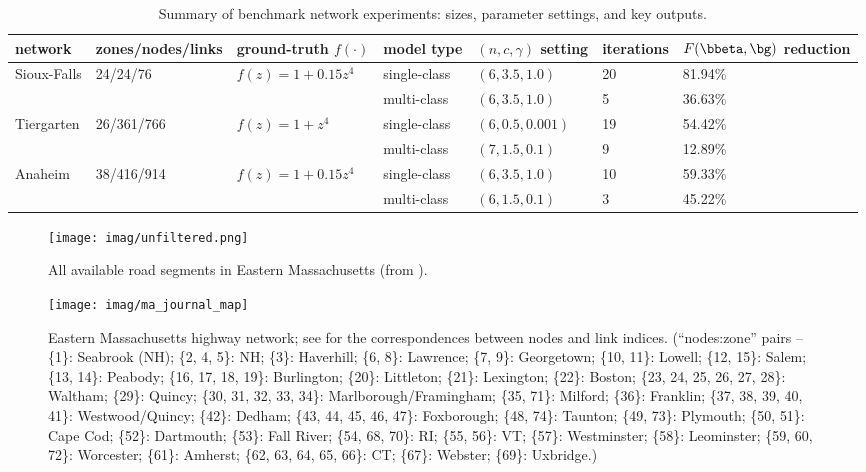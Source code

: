 \documentclass[3p]{elsarticle}
\begin{document}
	
	
\begin{table*}[hbt] 
	\centering
	\caption{Summary of benchmark network experiments: sizes,
          parameter settings, and key outputs.} \label{tab1} 
	\resizebox{\linewidth}{!}
	{\begin{tabular}{lllllll}
			\toprule[1.2pt]
			\textbf{network}  & \textbf{zones/nodes/links} & \textbf{ground-truth $f(\cdot)$} & \textbf{model type} & \textbf{$(n,c,\gamma)$ setting}  & \textbf{iterations} & \textbf{$F(\bbeta,\bg)$ reduction}  \\
			\midrule[1.2pt]
			\multirow{2}{*}{Sioux-Falls} & \multirow{2}{*}{24/24/76} & \multirow{2}{*}{$f(z) = 1 + 0.15z^4$} & single-class & $(6,3.5,1.0)$ &  20  & 81.94\% \\ & & & multi-class  & $(6,3.5,1.0)$ &  5  & 36.63\% \\
			\midrule[1.2pt]
			\multirow{2}{*}{Tiergarten}  & \multirow{2}{*}{26/361/766}  & \multirow{2}{*}{$f(z) = 1 + z^4$} & single-class & $(6,0.5,0.001)$  & 19  & 54.42\% \\& & & multi-class & $(7,1.5,0.1)$ &  9  & 12.89\% \\
			\midrule[1.2pt]
			\multirow{2}{*}{Anaheim}  & \multirow{2}{*}{38/416/914}  & \multirow{2}{*}{$f(z) = 1 + 0.15z^4$} & single-class & $(6,3.5,1.0)$ & 10 & 59.33\% \\& & & multi-class & $(6,1.5,0.1)$ &  3  & 45.22\% \\
			\bottomrule[1.2pt]
	\end{tabular}}
\end{table*}

	
\begin{figure}[H]
	\centering
	\texttt{[image: imag/unfiltered.png]}
	\caption{All available road segments in Eastern Massachusetts (from \cite{CDC16}).}
	\label{eastMA}
\end{figure}

\begin{figure}[htp]  
	\centering
	\texttt{[image: imag/ma\_journal\_map]}
	\caption{Eastern Massachusetts highway network; see \cite{InverseVIsTraffic} for the correspondences between nodes and link indices. (``nodes:zone'' pairs -- \{1\}: Seabrook (NH); \{2, 4, 5\}: NH; \{3\}: Haverhill; \{6, 8\}: Lawrence; \{7, 9\}: Georgetown; \{10, 11\}: Lowell; \{12, 15\}: Salem; \{13, 14\}: Peabody; \{16, 17, 18, 19\}: Burlington; \{20\}: Littleton; \{21\}: Lexington; \{22\}: Boston; \{23, 24, 25, 26, 27, 28\}: Waltham; \{29\}: Quincy; \{30, 31, 32, 33, 34\}: Marlborough/Framingham; \{35, 71\}: Milford; \{36\}: Franklin; \{37, 38, 39, 40, 41\}: Westwood/Quincy; \{42\}: Dedham; \{43, 44, 45, 46, 47\}: Foxborough; \{48, 74\}: Taunton; \{49, 73\}: Plymouth; \{50, 51\}: Cape Cod; \{52\}: Dartmouth; \{53\}: Fall River; \{54, 68, 70\}: RI; \{55, 56\}: VT; \{57\}: Westminster; \{58\}: Leominster; \{59, 60, 72\}: Worcester; \{61\}: Amherst; \{62, 63, 64, 65, 66\}: CT; \{67\}: Webster; \{69\}: Uxbridge.)}
	\label{fig:zoneMA}
\end{figure}
\end{document}
